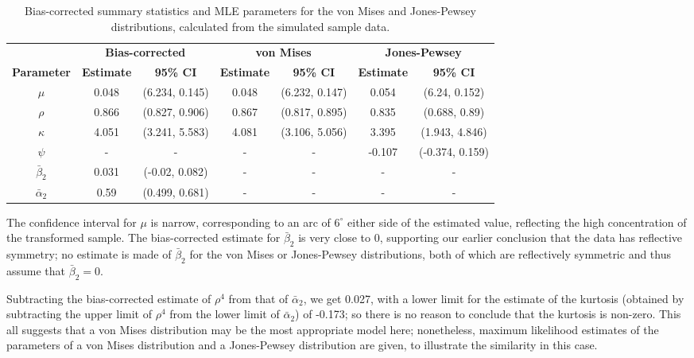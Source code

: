 \documentclass[../../ArchStats.tex]{subfiles}
\begin{document}
\begin{table}[!h]
\footnotesize
\centering
\caption{Bias-corrected summary statistics and MLE parameters for the von Mises and Jones-Pewsey distributions, calculated from the simulated sample data.}
\label{tab:sim-statistics}
\begin{tabular}{c|cc|cc|cc}
\hline 
 & \multicolumn{2}{c|}{\textbf{Bias-corrected}} & \multicolumn{2}{c|}{\textbf{von Mises}} & \multicolumn{2}{c}{\textbf{Jones-Pewsey}} \\
\textbf{Parameter} & \textbf{Estimate} & \textbf{95\% CI} & \textbf{Estimate} & \textbf{95\% CI} & \textbf{Estimate} & \textbf{95\% CI} \\
\hline
$\mu$ & 0.048 & (6.234, 0.145) & 0.048 & (6.232, 0.147) & 0.054 & (6.24, 0.152) \\ 
$\rho$ & 0.866 & (0.827, 0.906) & 0.867 & (0.817, 0.895) & 0.835 & (0.688, 0.89) \\ 
$\kappa$ & 4.051 & (3.241, 5.583) & 4.081 & (3.106, 5.056) & 3.395 & (1.943, 4.846) \\ 
$\psi$ & - & - & - & - & -0.107 & (-0.374, 0.159) \\ 
$\bar{\beta}_2$ & 0.031 & (-0.02, 0.082) & - & - & - & - \\ 
$\bar{\alpha}_2 $ & 0.59 & (0.499, 0.681) & - & - & - & - \\ 
\hline
\end{tabular}
\end{table}


The confidence interval for $\mu$ is narrow, corresponding to an arc of $6^\circ$ either side of the estimated value, reflecting the high concentration of the transformed sample. The bias-corrected estimate for $\bar{\beta}_2$ is very close to 0, supporting our earlier conclusion that the data has reflective symmetry; no estimate is made of $\bar{\beta}_2$ for the von Mises or Jones-Pewsey distributions, both of which are reflectively symmetric and thus assume that $\bar{\beta}_2 = 0$. 

Subtracting the bias-corrected estimate of $\rho^4$ from that of $\bar{\alpha}_2$, we get 0.027, with a lower limit for the estimate of the kurtosis (obtained by subtracting the upper limit of $\rho^4$ from the lower limit of $\bar{\alpha}_2$) of -0.173; so there is no reason to conclude that the kurtosis is non-zero. This all suggests that a von Mises distribution may be the most appropriate model here; nonetheless, maximum likelihood estimates of the parameters of a von Mises distribution and a Jones-Pewsey distribution are given, to illustrate the similarity in this case.
\end{document}

